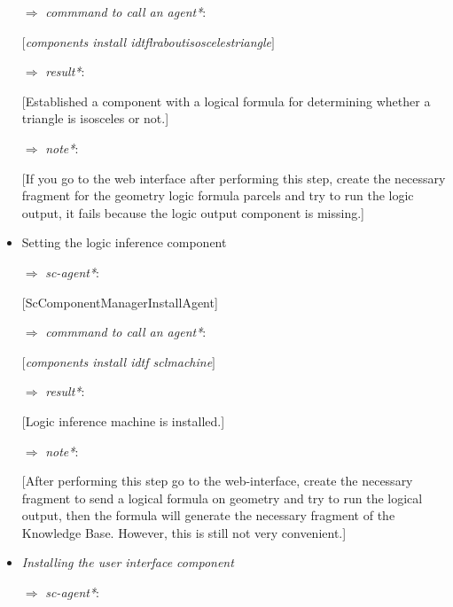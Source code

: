 \documentclass[10pt, a4paper]{article}
\begin{document}
\begin{multicols}{2}
\begin{flushleft}
\begin{itemize}
[ScComponentManagerInstallAgent]
\vspace{-0.25cm}\item [ $\Rightarrow$]\textit{commmand to call an agent*}:


\textit{$[$components install \textendash \textendash idtflr\textunderscore about\textunderscore isosceles\textunderscore triangle$]$}
\vspace{-0.2cm}\item [ $\Rightarrow$]\textit{result*}:


[Established a component with a logical formula for determining whether a triangle is isosceles or not.]
\vspace{-0.2cm}\item [ $\Rightarrow$]\textit{note*}:


[If you go to the web interface after performing this step, create the necessary fragment for the geometry logic formula parcels and try to run the logic output, it fails because the logic output component is missing.]
\itemindent 0cm \vspace{-0.2cm}    \item Setting the logic inference component
\itemindent 0.3cm \vspace{-0.25cm}\item [ $\Rightarrow$]\textit{sc-agent*}:


[ScComponentManagerInstallAgent]
\vspace{-0.2cm}\item [ $\Rightarrow$]\textit{commmand to call an agent*}:


\vspace{-0.1cm}\textit{$[$components install \textendash \textendash idtf
scl\textunderscore machine$]$}
\vspace{-0.2cm}\item [ $\Rightarrow$]\textit{result*}:


[Logic inference machine is installed.]
\vspace{-0.35cm}\item [ $\Rightarrow$]\textit{note*}:


[After performing this step go to the web-interface, create the necessary fragment to send a logical formula on geometry and try to run the logical output, then the formula will generate the necessary fragment of the Knowledge Base. However, this is still not very convenient.]
\itemindent 0cm   \vspace{-0.35cm}  \item \textit{Installing the user interface component}
\itemindent 0.3cm \vspace{-0.35cm}\item [ $\Rightarrow$]\textit{sc-agent*}:



\end{itemize}
\end{flushleft}
\end{multicols}
\end{document}
